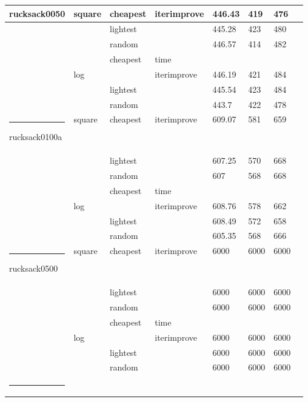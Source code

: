 \documentclass[11pt,a4paper]{article}
\makeatletter
\def\hlinewd#1{
  \noalign{\ifnum0=`}\fi\hrule \@height #1 \futurelet
  \reserved@a\@xhline
}
\makeatother
\begin{document}
\begin{table}[!t]
\begin{tabular}{ | l | l | l | l | l | l | l | l | }
        rucksack0050 & square & cheapest & iterimprove & 446.43 & 419 & \textcolor{BrickRed}{476} \\ \hline
        &            & lightest & & 445.28 & 423 & 480 \\ \hline
        &            & random & & \textcolor{OliveGreen}{446.57} & 414 & 482 \\ \hline
        &            & cheapest & time &  &  &  \\ \hline
        & log        & & iterimprove & 446.19 & 421 & \textcolor{OliveGreen}{484} \\ \hline
        &            & lightest & & 445.54 & 423 & \textcolor{OliveGreen}{484} \\ \hline
        &            & random & & \textcolor{BrickRed}{443.7} & 422 & 478 \\ \hlinewd{3pt}
        rucksack0100a & square & cheapest & iterimprove & \textcolor{OliveGreen}{609.07} & 581 & 659 \\ \hline
        &             & lightest & & 607.25 & 570 & \textcolor{OliveGreen}{668} \\ \hline
        &             & random & & 607 & 568 & \textcolor{OliveGreen}{668} \\ \hline
        &             & cheapest & time &  &  &  \\ \hline
        & log         & & iterimprove & 608.76 & 578 & 662 \\ \hline
        &             & lightest & & 608.49 & 572 & \textcolor{BrickRed}{658} \\ \hline
        &             & random & & \textcolor{BrickRed}{605.35} & 568 & 666 \\ \hlinewd{3pt}
        rucksack0500 & square & cheapest & iterimprove & 6000 & 6000 & 6000 \\ \hline
        &            & lightest & & 6000 & 6000 & 6000 \\ \hline
        &            & random & & 6000 & 6000 & 6000 \\ \hline
        &            & cheapest & time &  &  &  \\ \hline
        & log        & & iterimprove & 6000 & 6000 & 6000 \\ \hline
        &            & lightest & & 6000 & 6000 & 6000 \\ \hline
        &            & random & & 6000 & 6000 & 6000 \\ \hlinewd{3pt}

\end{tabular}
\end{table}
\end{document}

